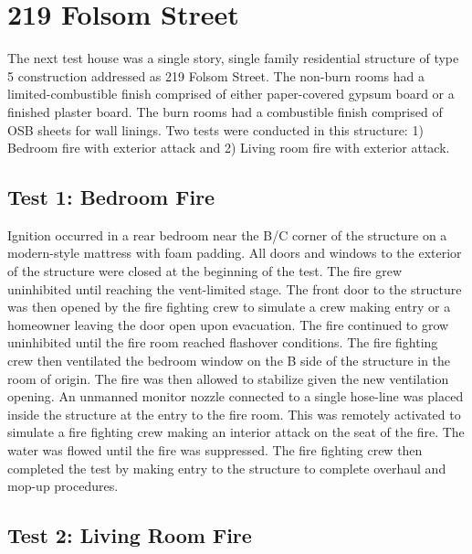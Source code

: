 \documentclass{article}
\begin{document}
\section{219 Folsom Street}

The next test house was a single story, single family residential structure of type 5 construction addressed as 219 Folsom Street. The non-burn rooms had a limited-combustible finish comprised of either paper-covered gypsum board or a finished plaster board.  The burn rooms had a combustible finish comprised of OSB sheets for wall linings.  Two tests were conducted in this structure: 1) Bedroom fire with exterior attack and 2) Living room fire with exterior attack.    

\subsection{Test 1: Bedroom Fire}

Ignition occurred in a rear bedroom near the B/C corner of the structure on a modern-style mattress with foam padding. All doors and windows to the exterior of the structure were closed at the beginning of the test. The fire grew uninhibited until reaching the vent-limited stage.  The front door to the structure was then opened by the fire fighting crew to simulate a crew making entry or a homeowner leaving the door open upon evacuation. The fire continued to grow uninhibited until the fire room reached flashover conditions. The fire fighting crew then ventilated the bedroom window on the B side of the structure in the room of origin. The fire was then allowed to stabilize given the new ventilation opening. An unmanned monitor nozzle connected to a single hose-line was placed inside the structure at the entry to the fire room.  This was remotely activated to simulate a fire fighting crew making an interior attack on the seat of the fire.  The water was flowed until the fire was suppressed. The fire fighting crew then completed the test by making entry to the structure to complete overhaul and mop-up procedures. 

\subsection{Test 2: Living Room Fire}
  
\end{document}
